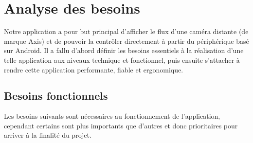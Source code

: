 \chapter{Analyse des besoins}
Notre application a pour but principal d'afficher le flux d'une caméra distante (de marque Axis) et de pouvoir la contrôler directement à partir du périphérique basé sur Android.
Il a fallu d'abord définir les besoins essentiels à la réalisation d'une telle application aux niveaux technique et fonctionnel, puis ensuite s'attacher à rendre cette application
performante, fiable et ergonomique.

\section{Besoins fonctionnels}
Les besoins suivants sont nécessaires au fonctionnement de l'application, cependant certains sont plus importants que d'autres et donc prioritaires pour arriver à la finalité du projet.
\newline
